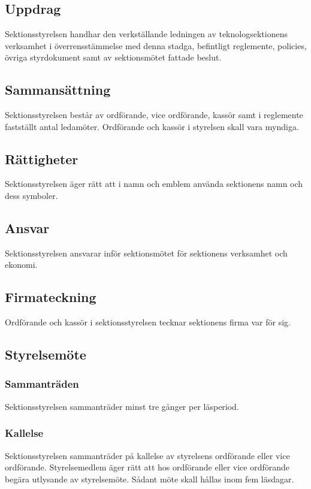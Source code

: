\section{\STYRITFULL}

\subsection{Uppdrag}
Sektionsstyrelsen handhar den verkställande ledningen av teknologsektionens verksamhet i överrensstämmelse med denna stadga, befintligt reglemente, policies, övriga styrdokument samt av sektionsmötet fattade beslut.

\subsection{Sammansättning}
Sektionsstyrelsen består av ordförande, vice ordförande, kassör samt i reglemente fastställt antal ledamöter. Ordförande och kassör i styrelsen skall vara myndiga.

\subsection{Rättigheter}
Sektionsstyrelsen äger rätt att i namn och emblem använda sektionens namn och dess symboler.

\subsection{Ansvar}
Sektionsstyrelsen ansvarar inför sektionsmötet för sektionens verksamhet och ekonomi.

\subsection{Firmateckning}
Ordförande och kassör i sektionsstyrelsen tecknar sektionens firma var för sig.

\subsection{Styrelsemöte}

\subsubsection{Sammanträden}
Sektionsstyrelsen sammanträder minst tre gånger per läsperiod.

\subsubsection{Kallelse}
Sektionsstyrelsen sammanträder på kallelse av styrelsens ordförande eller vice ordförande. Styrelsemedlem äger rätt att hos ordförande eller vice ordförande begära utlysande av styrelsemöte. Sådant möte skall hållas inom fem läsdagar.


